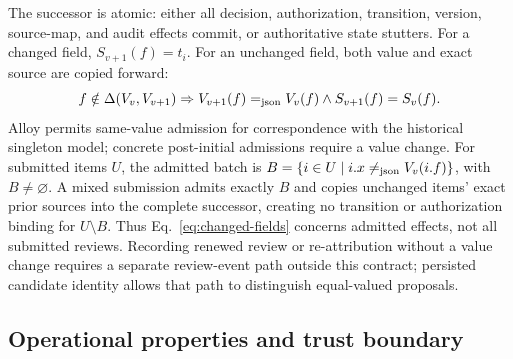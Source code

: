 The successor is atomic: either all decision, authorization, transition, version, source-map, and audit effects commit, or authoritative state stutters. For a changed field, $S_{v+1}(f)=t_i$. For an unchanged field, both value and exact source are copied forward:
\begin{equation}
f\notin\Delta(V_v,V_{v+1})\Rightarrow
V_{v+1}(f)\mathrel{=_{\mathrm{json}}} V_v(f)\land S_{v+1}(f)=S_v(f).
\label{eq:copy-forward}
\end{equation}
Alloy permits same-value admission for correspondence with the historical singleton model; concrete post-initial admissions require a value change. For submitted items $U$, the admitted batch is $B=\{i\in U\mid i.x\mathrel{\neq_{\mathrm{json}}} V_v(i.f)\}$, with $B\neq\varnothing$. A mixed submission admits exactly $B$ and copies unchanged items' exact prior sources into the complete successor, creating no transition or authorization binding for $U\setminus B$. Thus Eq.~\eqref{eq:changed-fields} concerns admitted effects, not all submitted reviews. Recording renewed review or re-attribution without a value change requires a separate review-event path outside this contract; persisted candidate identity allows that path to distinguish equal-valued proposals.

\subsection{Operational properties and trust boundary}

